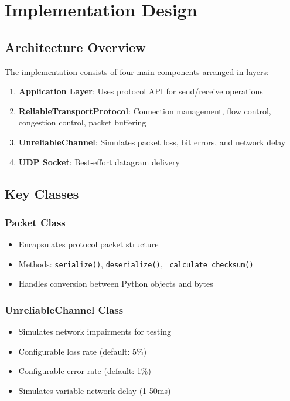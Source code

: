 \documentclass[11pt,a4paper]{article}
\begin{document}
\section{Implementation Design}

\subsection{Architecture Overview}

The implementation consists of four main components arranged in layers:

\begin{enumerate}
    \item \textbf{Application Layer}: Uses protocol API for send/receive operations
    \item \textbf{ReliableTransportProtocol}: Connection management, flow control, congestion control, packet buffering
    \item \textbf{UnreliableChannel}: Simulates packet loss, bit errors, and network delay
    \item \textbf{UDP Socket}: Best-effort datagram delivery
\end{enumerate}

\subsection{Key Classes}

\subsubsection{Packet Class}
\begin{itemize}
    \item Encapsulates protocol packet structure
    \item Methods: \texttt{serialize()}, \texttt{deserialize()}, \texttt{\_calculate\_checksum()}
    \item Handles conversion between Python objects and bytes
\end{itemize}

\subsubsection{UnreliableChannel Class}
\begin{itemize}
    \item Simulates network impairments for testing
    \item Configurable loss rate (default: 5\%)
    \item Configurable error rate (default: 1\%)
    \item Simulates variable network delay (1-50ms)
\end{itemize}
\end{document}
